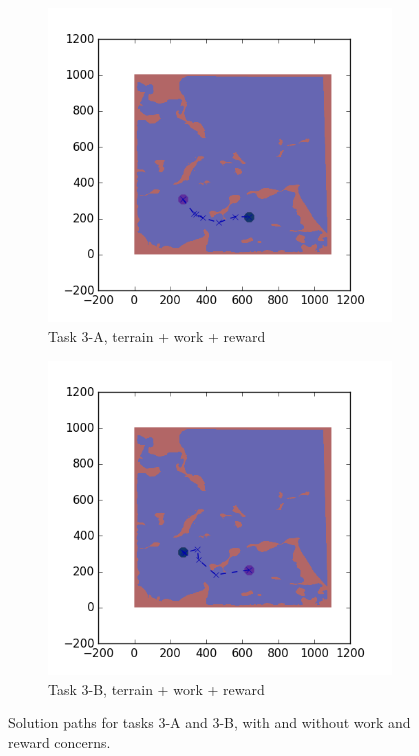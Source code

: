 \documentclass{tamuccthesis}
\begin{document}
\begin{figure}
  \begin{subfigure}[b]{0.4\textwidth}
        \centering
        \includegraphics[width=\textwidth,trim={4cm 3cm 2cm 3cm},clip]{EXP3RG_PathCa_-1_-1_-1_-1.png}
        \caption{Task 3-A, terrain + work + reward}
        \label{fig:Path_3-A_terrain_work_reward}
    \end{subfigure}
    \hfill
    \begin{subfigure}[b]{0.4\textwidth}  
        \centering 
        \includegraphics[width=\textwidth,trim={4cm 3cm 2cm 3cm},clip]{EXP3RG_PathCb_-1_-1_-1_-1.png}
        \caption{Task 3-B, terrain + work + reward}
        \label{fig:Path_3-B_terrain_work_reward}
    \end{subfigure}

    \caption{Solution paths for tasks 3-A and 3-B, with and without work and reward concerns.} 
    \label{fig:Paths_3-A_3-B}
\end{figure}
\end{document}

